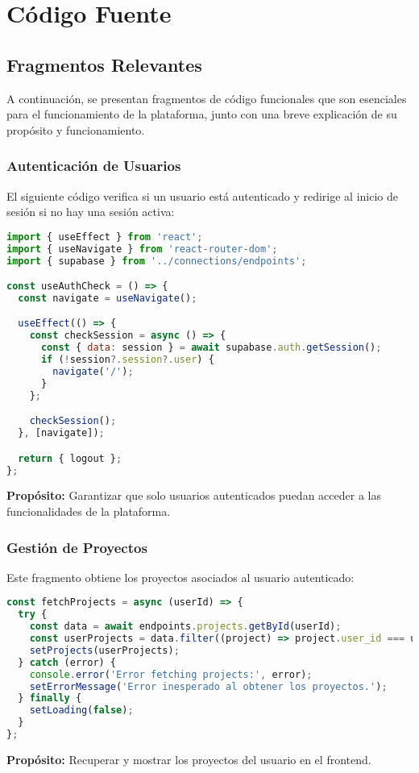 \section{Código Fuente}

\subsection*{Fragmentos Relevantes}
A continuación, se presentan fragmentos de código funcionales que son esenciales para el funcionamiento de la plataforma, junto con una breve explicación de su propósito y funcionamiento.

\subsubsection*{Autenticación de Usuarios}
El siguiente código verifica si un usuario está autenticado y redirige al inicio de sesión si no hay una sesión activa:
\begin{lstlisting}[language=JavaScript]
import { useEffect } from 'react';
import { useNavigate } from 'react-router-dom';
import { supabase } from '../connections/endpoints';

const useAuthCheck = () => {
  const navigate = useNavigate();

  useEffect(() => {
    const checkSession = async () => {
      const { data: session } = await supabase.auth.getSession();
      if (!session?.session?.user) {
        navigate('/');
      }
    };

    checkSession();
  }, [navigate]);

  return { logout };
};
\end{lstlisting}
\textbf{Propósito:} Garantizar que solo usuarios autenticados puedan acceder a las funcionalidades de la plataforma.
\newpage
\subsubsection*{Gestión de Proyectos}
Este fragmento obtiene los proyectos asociados al usuario autenticado:
\begin{lstlisting}[language=JavaScript]
const fetchProjects = async (userId) => {
  try {
    const data = await endpoints.projects.getById(userId);
    const userProjects = data.filter((project) => project.user_id === userId);
    setProjects(userProjects);
  } catch (error) {
    console.error('Error fetching projects:', error);
    setErrorMessage('Error inesperado al obtener los proyectos.');
  } finally {
    setLoading(false);
  }
};
\end{lstlisting}
\textbf{Propósito:} Recuperar y mostrar los proyectos del usuario en el frontend.

